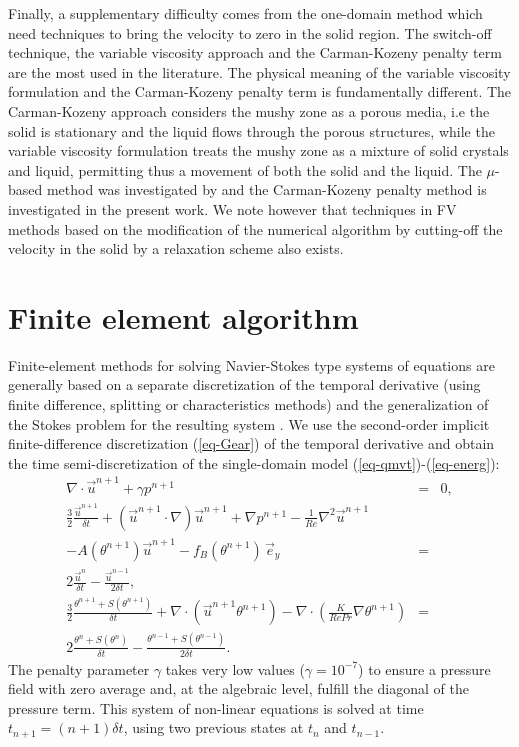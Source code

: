 Finally, a supplementary difficulty comes from the one-domain method which need techniques to bring the velocity to zero in the solid region.
The switch-off technique, the variable viscosity approach and the Carman-Kozeny penalty term are the most used in the literature.
The physical meaning of the variable viscosity formulation and the Carman-Kozeny penalty term is fundamentally different.
The Carman-Kozeny approach considers the mushy zone as a porous media, i.e the solid is stationary and the liquid flows through the porous structures, 
while the variable viscosity formulation treats the mushy zone as a mixture of solid crystals and liquid, permitting thus a movement of both the solid and the liquid.
The $\mu$-based method was investigated by \cite{dan-2014-JCP} and the Carman-Kozeny penalty method is investigated in the present work.
We note however that techniques in FV methods based on the modification of the numerical algorithm by cutting-off the velocity in the solid by a relaxation scheme also exists.

\newpage
\section{Finite element algorithm} \label{sec-FE-algo}

Finite-element methods for solving Navier-Stokes type systems of equations  are generally based on a separate discretization of the temporal derivative (using finite difference, splitting or characteristics methods) and the generalization of the Stokes problem for the resulting system \citep{Temam,GRaviart,Quarteroni}. We use the second-order implicit finite-difference discretization (\ref{eq-Gear}) of the temporal derivative and obtain the time semi-discretization of the single-domain model (\ref{eq-qmvt})-(\ref{eq-energ}):
\begin{eqnarray} \label{eq-time-disc1}
\nabla\cdot \vec{u}^{n+1} + {\gamma} p^{n+1} &=& 0, \\ %
\frac{3}{2} \frac{\vec{u}^{n+1}}{\delta t} +(\vec{u}^{n+1}\cdot\nabla) \vec{u}^{n+1} +\nabla p^{n+1} 
- {\frac{1}{Re} \nabla^2 \vec u^{n+1}}  & & \\ \nonumber 
- A(\theta^{n+1})\vec u^{n+1}- f_B(\theta^{n+1}) \, \vec{e}_y &=&  \\ \nonumber
2 \frac{\vec{u}^{n}}{\delta t}-\frac{\vec{u}^{n-1}}{2\delta t},\\ \label{eq-time-disc3}
\frac{3}{2} \frac{\theta^{n+1} + S(\theta^{n+1})}{\delta t} +
\nabla\cdot\left(\vec{u}^{n+1} \theta^{n+1}\right)
- \nabla \cdot\left( \frac{K}{RePr} \nabla \theta^{n+1} \right) &=& \\  \nonumber
2\frac{ \theta^{n} + S(\theta^{n})}{\delta t}-\frac{ \theta^{n-1} + S(\theta^{n-1}) }{2\delta t}.
\end{eqnarray}
The penalty parameter $\gamma$ takes very low values ($\gamma=10^{-7}$)  to ensure a pressure field with zero average and, at the algebraic level, fulfill the diagonal of the pressure term.  
This system of non-linear equations is solved at time  $t_{n+1}=(n+1) \delta t$, using two  previous states at $t_{n}$ and $t_{n-1}$.

